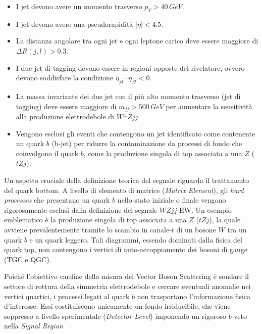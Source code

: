 \documentclass[11pt]{article}
\newcommand{\mjj}{\ensuremath{m_{jj}}}
\begin{document}
\begin{itemize}
    \item I jet devono avere un momento trasverso $p_T > 40\,\unit{GeV}$.
    \item I jet devono avere una pseudorapidità $|\eta| < 4.5$.
    \item La distanza angolare tra ogni jet e ogni leptone carico deve essere maggiore di $\Delta R(j,l) > 0.3$.
    \item I due jet di tagging devono essere in regioni opposte del rivelatore, ovvero devono soddisfare la condizione $\eta_{j1} \cdot \eta_{j2} < 0$.
    \item La massa invariante dei due jet con il più alto momento trasverso (jet di tagging) deve essere maggiore di $\mjj > 500\,\unit{GeV}$ per aumentare la sensitività alla produzione elettrodebole di $W^\pm Zjj$.
    \item Vengono esclusi gli eventi che contengono un jet identificato come contenente un quark $b$ (b-jet) per ridurre la contaminazione da processi di fondo che coinvolgono il quark $b$, come la produzione singola di top associata a una $Z$ ($tZj$).
\end{itemize}
Un aspetto cruciale della definizione teorica del segnale riguarda il trattamento del quark bottom. A livello di elemento di matrice (\textit{Matrix Element}), gli \textit{hard processes} che presentano un quark $b$ nello stato iniziale o finale vengono rigorosamente esclusi dalla definizione del segnale $WZjj$-EW. Un esempio emblematico è la produzione singola di top associata a una $Z$ ($tZj$), la quale avviene prevalentemente tramite lo scambio in canale-$t$ di un bosone $W$ tra un quark $b$ e un quark leggero. Tali diagrammi, essendo dominati dalla fisica del quark top, non contengono i vertici di auto-accoppiamento dei bosoni di gauge (TGC e QGC). 

Poiché l'obiettivo cardine della misura del Vector Boson Scattering è sondare il settore di rottura della simmetria elettrodebole e cercare eventuali anomalie nei vertici quartici, i processi legati al quark $b$ non trasportano l'informazione fisica d'interesse. Essi costituiscono unicamente un fondo irriducibile, che viene soppresso a livello sperimentale (\textit{Detector Level}) imponendo un rigoroso $b$-veto nella \textit{Signal Region}
\end{document}
